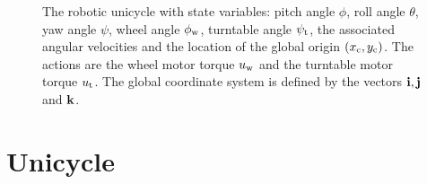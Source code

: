 




\begin{figure}
\centering

\caption{The robotic unicycle with state variables: pitch angle $\phi$, roll angle $\theta$, yaw angle $\psi$, wheel angle $\phi_{\text{w}}$, turntable angle $\psi_{\text{t}}$, the associated angular velocities and the location of the global origin $(x_{\text{c}},y_{\text{c}})$. The actions are the wheel motor torque $u_{\text{w}}$ and the turntable motor torque $u_{\text{t}}$. The global coordinate system is defined by the vectors $\mathbf{i}, \mathbf{j}$ and $\mathbf{k}$.}
\label{fig:unibody}
\end{figure}





\section{Unicycle} \label{app:unicycle}
